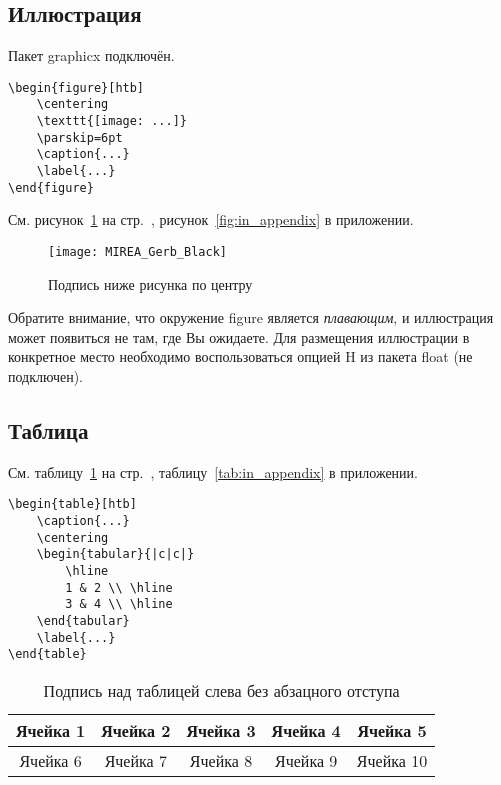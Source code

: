 \documentclass[14pt, a4paper, titlepage]{extarticle}
\begin{document}
\subsection{Иллюстрация}
 
Пакет graphicx подключён.

\begin{verbatim}
\begin{figure}[htb]
    \centering
    \texttt{[image: ...]}
    \parskip=6pt
    \caption{...}
    \label{...}
\end{figure}
\end{verbatim}

См. рисунок~\ref{fig:test_label} на стр.~\pageref{fig:test_label}, рисунок~\ref{fig:in_appendix} в приложении.

\begin{figure}[htb]
    \centering
    \texttt{[image: MIREA\_Gerb\_Black]}
    \parskip=6pt
    \caption{Подпись ниже рисунка по центру}
    \label{fig:test_label}
\end{figure}

Обратите внимание, что окружение figure является \emph{плавающим}, и иллюстрация может появиться не там, где Вы ожидаете. Для размещения иллюстрации в конкретное место необходимо воспользоваться опцией H из пакета float (не подключен).

\subsection{Таблица}

См. таблицу~\ref{tab:test_label} на стр.~\pageref{tab:test_label}, таблицу~\ref{tab:in_appendix} в приложении.

\begin{verbatim}
\begin{table}[htb]
    \caption{...}
    \centering
    \begin{tabular}{|c|c|} 
        \hline
        1 & 2 \\ \hline
        3 & 4 \\ \hline
    \end{tabular}
    \label{...}
\end{table}
\end{verbatim}

\begin{table}[htb]
    \caption{Подпись над таблицей слева без абзацного отступа}
    \centering
    \begin{tabular}{ |c|c|c|c|c| } 
        \hline
        Ячейка 1 & Ячейка 2 & Ячейка 3 & Ячейка 4 & Ячейка 5 \\ \hline
        Ячейка 6 & Ячейка 7 & Ячейка 8 & Ячейка 9 & Ячейка 10 \\ \hline
    \end{tabular}
    \label{tab:test_label}
\end{table}
\end{document}
